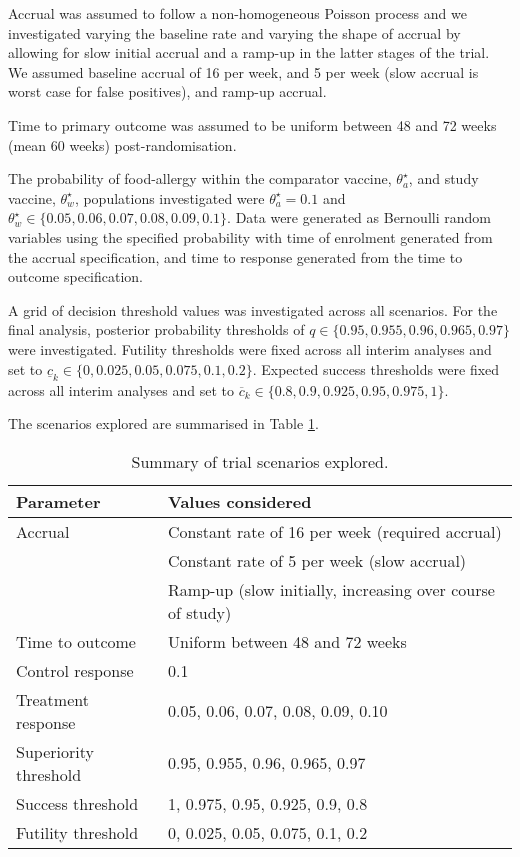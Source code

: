 \documentclass{bmcart}
\begin{document}
Accrual was assumed to follow a non-homogeneous Poisson process and we investigated varying the baseline rate and varying the shape of accrual by allowing for slow initial accrual and a ramp-up in the latter stages of the trial.
We assumed baseline accrual of 16 per week, and 5 per week (slow accrual is worst case for false positives), and ramp-up accrual.

Time to primary outcome was assumed to be uniform between 48 and 72 weeks (mean 60 weeks) post-randomisation.

The probability of food-allergy within the comparator vaccine, $\theta_a^\star$, and study vaccine, $\theta_w^\star$, populations investigated were $\theta_a^\star=0.1$ and $\theta_w^\star\in\{0.05, 0.06, 0.07, 0.08, 0.09,0.1\}$.
Data were generated as Bernoulli random variables using the specified probability with time of enrolment generated from the accrual specification, and time to response generated from the time to outcome specification.

A grid of decision threshold values was investigated across all scenarios.
For the final analysis, posterior probability thresholds of $q\in\{0.95,0.955,0.96,0.965,0.97\}$ were investigated.
Futility thresholds were fixed across all interim analyses and set to $\underline{c}_k\in\{0,0.025,0.05,0.075,0.1,0.2\}$.
Expected success thresholds were fixed across all interim analyses and set to $\overline{c}_k\in\{0.8,0.9,0.925,0.95,0.975,1\}$.

The scenarios explored are summarised in Table \ref{tab:scenarios}.

\begin{table}[!ht]
	\caption{Summary of trial scenarios explored.}
	\label{tab:scenarios}
	\begin{tabular}{ll}
		Parameter & Values considered \\ \hline
		Accrual & Constant rate of 16 per week (required accrual) \\
		& Constant rate of 5 per week (slow accrual) \\
		& Ramp-up (slow initially, increasing over course of study) \\
		Time to outcome & Uniform between 48 and 72 weeks \\
		Control response & 0.1 \\
		Treatment response & 0.05, 0.06, 0.07, 0.08, 0.09, 0.10 \\
		Superiority threshold & 0.95, 0.955, 0.96, 0.965, 0.97 \\
		Success threshold & 1, 0.975, 0.95, 0.925, 0.9, 0.8 \\
		Futility threshold & 0, 0.025, 0.05, 0.075, 0.1, 0.2 \\
		\hline
	\end{tabular}
\end{table}
\end{document}
